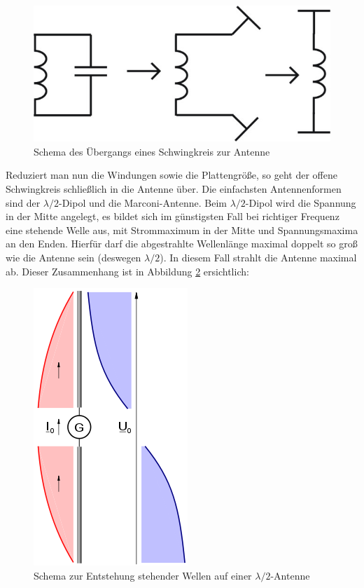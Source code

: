 	\begin{figure}[H]	
		\center	
		\includegraphics[scale = 0.35]{messwerte/schwingkreis-antenne.png}
		\caption{\centering Schema des Übergangs eines Schwingkreis zur Antenne \cite{unterlagen}} %
		\label{schwingkreis_antenne}	
	\end{figure}

	Reduziert man nun die Windungen sowie die Plattengröße, so geht der offene Schwingkreis schließlich in die Antenne über. 
	Die einfachsten Antennenformen sind der $\lambda/2$-Dipol und die Marconi-Antenne. 
	Beim $\lambda/2$-Dipol wird die Spannung in der Mitte angelegt, es bildet sich im günstigsten Fall bei richtiger Frequenz eine stehende Welle aus, mit Strommaximum in der Mitte und Spannungsmaxima an den Enden. 
	Hierfür darf die abgestrahlte Wellenlänge maximal doppelt so groß wie die Antenne sein (deswegen $\lambda/2$). 
	In diesem Fall strahlt die Antenne maximal ab. 
	Dieser Zusammenhang ist in Abbildung \ref{schema_antenne_welle} ersichtlich:

	\begin{figure}[H]	
		\center	
		\includegraphics[scale = 0.45]{messwerte/220px-Lineare_antennen_svg.png}
		\caption{\centering Schema zur Entstehung stehender Wellen auf einer $\lambda /2$-Antenne \cite{wave}} %
		\label{schema_antenne_welle}	
	\end{figure}

